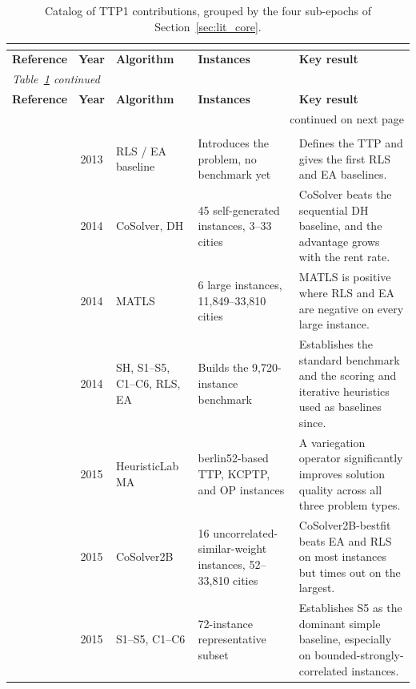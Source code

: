 {\footnotesize
\begin{longtable}{@{}p{2.8cm}cp{3.0cm}p{4.9cm}p{7.9cm}@{}}
\caption{Catalog of TTP1 contributions, grouped by the four sub-epochs of Section~\ref{sec:lit_core}.}\\\label{tab:cat_ttp1}\\
\toprule
\textbf{Reference} & \textbf{Year} & \textbf{Algorithm} & \textbf{Instances} & \textbf{Key result} \\
\midrule
\endfirsthead
\multicolumn{5}{l}{\footnotesize\itshape Table~\ref{tab:cat_ttp1} continued}\\ \toprule
\textbf{Reference} & \textbf{Year} & \textbf{Algorithm} & \textbf{Instances} & \textbf{Key result} \\
\midrule
\endhead
\midrule \multicolumn{5}{r}{\footnotesize continued on next page}\\
\endfoot
\bottomrule
\endlastfoot
\midrule \multicolumn{5}{l}{\textbf{Foundations and benchmarking, 2013--2015} (10 papers)} \\ \midrule
\citet{bonyadi2013travelling} & 2013 & RLS / EA baseline & Introduces the problem, no benchmark yet & Defines the TTP and gives the first RLS and EA baselines. \\
\citet{bonyadi2014socially} & 2014 & CoSolver, DH & 45 self-generated instances, 3--33 cities & CoSolver beats the sequential DH baseline, and the advantage grows with the rent rate. \\
\citet{mei2014improving} & 2014 & MATLS & 6 large instances, 11{,}849--33{,}810 cities & MATLS is positive where RLS and EA are negative on every large instance. \\
\citet{polyakovskiy2014comprehensive} & 2014 & SH, S1--S5, C1--C6, RLS, EA & Builds the 9{,}720-instance benchmark & Establishes the standard benchmark and the scoring and iterative heuristics used as baselines since. \\
\citet{beham2015optimization} & 2015 & HeuristicLab MA & berlin52-based TTP, KCPTP, and OP instances & A variegation operator significantly improves solution quality across all three problem types. \\
\citet{el2015cosolver2b} & 2015 & CoSolver2B & 16 uncorrelated-similar-weight instances, 52--33{,}810 cities & CoSolver2B-bestfit beats EA and RLS on most instances but times out on the largest. \\
\citet{faulkner2015approximate} & 2015 & S1--S5, C1--C6 & 72-instance representative subset & Establishes S5 as the dominant simple baseline, especially on bounded-strongly-correlated instances. \\

\end{longtable}}
